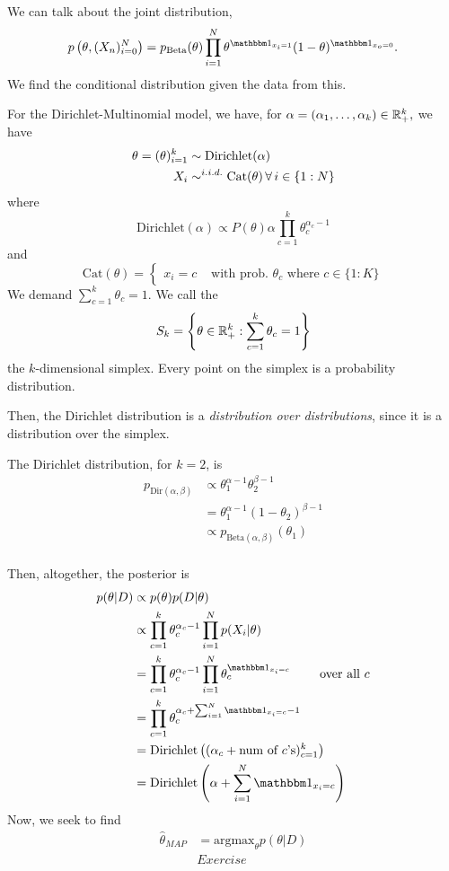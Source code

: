 \documentclass{chaistyle}
\begin{document}
We can talk about the joint distribution, \[p\left(\theta,(X_n)_{i=0}^N\right)=p_{\text{Beta}}(\theta)\prod_{i=1}^{N}\theta^{\indic_{x_i=1}}(1-\theta)^{\indic_{x_o=0}}.\] We find the conditional distribution given the data from this.

For the Dirichlet-Multinomial model, we have, for \(\alpha=(\alpha_1,\dots,\alpha_k)\in\mathbb{R}^k_+,\) we have \begin{align*}
    \theta=(\theta)_{i=1}^k&\sim\text{Dirichlet}(\alpha) \\
    X_i&\sim^{i.i.d.}\text{Cat}(\theta) \,\forall\, i\in\{1:N\}\\
\end{align*}
where \[\text{Dirichlet}(\alpha)\propto P(\theta)\alpha\prod_{c=1}^{k}\theta_c^{\alpha_c-1}\] and \[\text{Cat}(\theta)=\begin{cases}
    x_i=c&\text{ with prob. \(\theta_c\) where \(c\in\{1:K\}\)}
\end{cases}\] We demand \(\sum_{c=1}^{k} \theta_c=1.\) We call the \[S_k= \left\{\theta\in\mathbb{R}^k_+ : \sum_{c=1}^{k} \theta_c=1 \right\} \] the \(k\)-dimensional simplex. Every point on the simplex is a probability distribution.

Then, the Dirichlet distribution is a \emph{distribution over distributions}, since it is a distribution over the simplex.

\begin{example*}
    The Dirichlet distribution, for \(k=2\), is \begin{align*}
        p_{\text{Dir}(\alpha,\beta)}&\propto \theta_1^{\alpha-1}\theta_2^{\beta-1} \\
        &= \theta_1^{\alpha-1}(1-\theta_2)^{\beta-1} \\
        &\propto p_{\text{Beta}(\alpha,\beta)}(\theta_1) \\
    \end{align*}
\end{example*}
Then, altogether, the posterior is \begin{align*}
    p(\theta|D)&\propto p(\theta)p(D|\theta) \\
    &\propto \prod_{c=1}^{k} \theta_c^{\alpha_c-1}\prod_{i=1}^{N}p(X_i|\theta) \\
    &= \prod_{c=1}^{k} \theta_c^{\alpha_c-1}\prod_{i=1}^{N}\theta_c^{\indic_{x_i=c}}\qquad\text{ over all \(c\)} \\
    &= \prod_{c=1}^{k} \theta_c^{\alpha_c+\sum_{i=1}^{N}\indic_{x_i=c}-1} \\ 
    &= \text{Dirichlet}\left((\alpha_c+\text{num of \(c\)'s})_{c=1}^k\right) \\ 
    &= \text{Dirichlet}\left(\alpha+\sum_{i=1}^{N}\indic_{x_i=c}\right) \\
\end{align*}
Now, we seek to find \begin{align*}
    \hat\theta_{MAP}&=\text{argmax}_{\theta}p(\theta|D) \\
    &\boxed{Exercise}
\end{align*}
\end{document}
